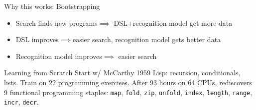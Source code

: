 \documentclass[final]{beamer}
\newlength{\onecolwid}
\newlength{\threecolwid}
\newcommand{\code}[1]{{\texttt{#1}}}
\newcommand{\system}{\textsc{DreamCoder}~}
\begin{document}
\begin{frame}[t]
\begin{columns}[t]
\begin{column}{\threecolwid}
\begin{columns}[t,totalwidth=\threecolwid]
\begin{column}{\onecolwid}
\begin{block}{Why this works: Bootstrapping}
\begin{figure}
\end{figure}
\begin{itemize}
\item Search finds new programs$\implies$ DSL+recognition model get more data
\item DSL improves$\implies$easier search, recognition model gets better data
  \item Recognition model improves$\implies$ easier search
  \end{itemize}



  
\end{block}

\begin{block}{Learning from Scratch}
  Start w/ McCarthy 1959 Lisp: recursion, conditionals, lists.
  Train on 22 programming exercises.
  After 93 hours on 64 CPUs, rediscovers 9 functional programming staples: \code{map},
  \code{fold}, \code{zip}, \code{unfold}, \code{index}, \code{length}, \code{range}, \code{incr}, \code{decr}.

  
\end{block}






\end{column}
\end{columns}
\end{column}
\end{columns}
\end{frame}
\end{document}
